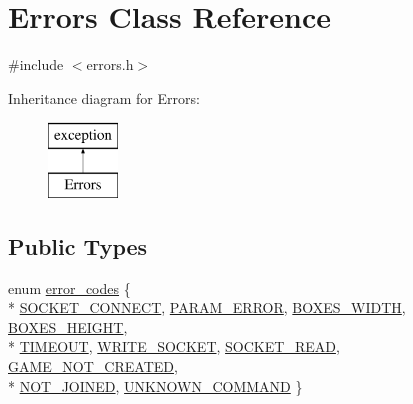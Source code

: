 \hypertarget{classErrors}{\section{Errors Class Reference}
\label{classErrors}
}


{\ttfamily \#include $<$errors.\-h$>$}

Inheritance diagram for Errors\-:\begin{figure}[H]
\begin{center}
\leavevmode
\includegraphics[height=2.000000cm]{classErrors}
\end{center}
\end{figure}
\subsection*{Public Types}
\begin{DoxyCompactItemize}
\item 
enum \hyperlink{classErrors_a93a0cc4db45d07a1395a8eaa9c39caf4}{error\-\_\-codes} \{ \\*
\hyperlink{classErrors_a93a0cc4db45d07a1395a8eaa9c39caf4ad367a96807f95dce493f81fedda82a15}{S\-O\-C\-K\-E\-T\-\_\-\-C\-O\-N\-N\-E\-C\-T}, 
\hyperlink{classErrors_a93a0cc4db45d07a1395a8eaa9c39caf4a62d04313dce718fbab4bf2d1ba40231e}{P\-A\-R\-A\-M\-\_\-\-E\-R\-R\-O\-R}, 
\hyperlink{classErrors_a93a0cc4db45d07a1395a8eaa9c39caf4a343a84847d2ea3da575fa80a35817e43}{B\-O\-X\-E\-S\-\_\-\-W\-I\-D\-T\-H}, 
\hyperlink{classErrors_a93a0cc4db45d07a1395a8eaa9c39caf4ad7dcb67868a667b1ab6ac60497f894c2}{B\-O\-X\-E\-S\-\_\-\-H\-E\-I\-G\-H\-T}, 
\\*
\hyperlink{classErrors_a93a0cc4db45d07a1395a8eaa9c39caf4a65c402720b8ae2b51cc905c7b596dc5d}{T\-I\-M\-E\-O\-U\-T}, 
\hyperlink{classErrors_a93a0cc4db45d07a1395a8eaa9c39caf4a3f4fcdb5424e1904051934ddba97fac6}{W\-R\-I\-T\-E\-\_\-\-S\-O\-C\-K\-E\-T}, 
\hyperlink{classErrors_a93a0cc4db45d07a1395a8eaa9c39caf4a35377db2acec293b3bc0f1f619009755}{S\-O\-C\-K\-E\-T\-\_\-\-R\-E\-A\-D}, 
\hyperlink{classErrors_a93a0cc4db45d07a1395a8eaa9c39caf4a7ae24fb4b67f13832aa78399563b4ba4}{G\-A\-M\-E\-\_\-\-N\-O\-T\-\_\-\-C\-R\-E\-A\-T\-E\-D}, 
\\*
\hyperlink{classErrors_a93a0cc4db45d07a1395a8eaa9c39caf4a098463bf2ad00a4735b1defd0d8cd121}{N\-O\-T\-\_\-\-J\-O\-I\-N\-E\-D}, 
\hyperlink{classErrors_a93a0cc4db45d07a1395a8eaa9c39caf4af5d508f9d3ac0c6d7abefce1c151c075}{U\-N\-K\-N\-O\-W\-N\-\_\-\-C\-O\-M\-M\-A\-N\-D}
 \}
\end{DoxyCompactItemize}
